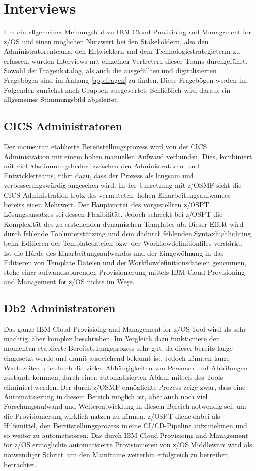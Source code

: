 \section{Interviews}
Um ein allgemeines Meinungsbild zu \glqq IBM Cloud Provisioing and Management for z/OS\grqq{} und einen möglichen Nutzwert bei den Stakeholdern, also den Administratorenteams, den Entwicklern und dem Technologiestrategieteam zu erfassen, wurden Interviews mit einzelnen Vertretern dieser Teams durchgeführt.
Sowohl der Fragenkatalog, als auch die ausgefüllten und digitalisierten Fragebögen sind im Anhang \ref{app:fragen} zu finden.
Diese Fragebögen werden im Folgenden zunächst nach Gruppen ausgewertet.
Schließlich wird daraus ein allgemeines Stimmungsbild abgeleitet.

\subsection{CICS Administratoren}
Der momentan etablierte Bereitstellungsprozess wird von der CICS Administration mit einem hohen manuellen Aufwand verbunden.
Dies, kombiniert mit viel Abstimmungsbedarf zwischen den Administratoren- und Entwicklerteams, führt dazu, dass der Prozess als langsam und verbesserungswürdig angesehen wird.
In der Umsetzung mit z/OSMF sieht die CICS Administration trotz des vermuteten, hohen Einarbeitungsaufwandes bereits einen Mehrwert.
Der Hauptvorteil des vorgestellten z/OSPT Lösungsansatzes sei dessen Flexibilität.
Jedoch schreckt bei z/OSPT die Komplexität des zu erstellenden dynamischen Templates ab.
Dieser Effekt wird durch fehlende Toolunterstützung und dem dadurch fehlenden Syntaxhighlighting beim Editieren der Templatedateien bzw. der Workflowdefinitionfiles verstärkt.
Ist die Hürde des Einarbeitungsaufwandes und der Eingewöhnung in das Editieren von Template Dateien und der Workflowdefinitionsdateien genommen, stehe einer aufwandssparenden Provisionierung mittels \glqq IBM Cloud Provisioning and Management for z/OS\grqq{} nichts im Wege.

\subsection{Db2 Administratoren}
Das ganze \glqq IBM Cloud Provisioing and Management for z/OS\grqq-Tool wird als sehr mächtig, aber komplex beschrieben.
Im Vergleich dazu funktioniere der momentan etablierte Bereitstellungsprozess sehr gut, da dieser bereits lange eingesetzt werde und damit ausreichend bekannt ist.
Jedoch könnten lange Wartezeiten, die durch die vielen Abhängigkeiten von Personen und Abteilungen zustande kommen, durch einen automatisierten Ablauf mittels des Tools eliminiert werden.
Der durch z/OSMF ermöglichte Prozess zeige zwar, dass eine Automatisierung in diesem Bereich möglich ist, aber auch noch viel Forschungsaufwand und Weiterentwicklung in diesem Bereich notwendig sei, um die Provisionierung wirklich nutzen zu können.
z/OSPT diene dabei als Hilfsmittel, den Bereitstellungsprozess in eine CI/CD-Pipeline aufzunehmen und so weiter zu automatisieren.
Das durch \glqq IBM Cloud Provisioing and Management for z/OS\grqq{} ermöglichte automatisierte Provisionieren von z/OS Middleware wird als notwendiger Schritt, um den Mainframe weiterhin erfolgreich zu betreiben, betrachtet.

